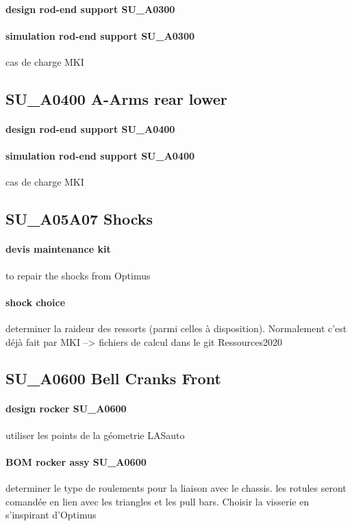 		\paragraph{design rod-end support SU\_A0300} 
		\paragraph{simulation rod-end support SU\_A0300} cas de charge MKI
	\subsection*{SU\_A0400 A-Arms rear lower} 
 \par 
		\paragraph{design rod-end support SU\_A0400} 
		\paragraph{simulation rod-end support SU\_A0400} cas de charge MKI
	\subsection*{SU\_A05A07 Shocks} 
 \par 
		\paragraph{devis maintenance kit} to repair the shocks from Optimus
		\paragraph{shock choice} determiner la raideur des ressorts (parmi celles à disposition). Normalement c'est déjà fait par MKI --> fichiers de calcul dans le git Ressources2020 
	\subsection*{SU\_A0600 Bell Cranks Front} 
 \par 
		\paragraph{design rocker SU\_A0600} utiliser les points de la géometrie LASauto
		\paragraph{BOM rocker assy SU\_A0600} determiner le type de roulements pour la liaison avec le chassis. les rotules seront comandée en lien avec les triangles et les pull bars. Choisir la visserie en s'inspirant d'Optimus
